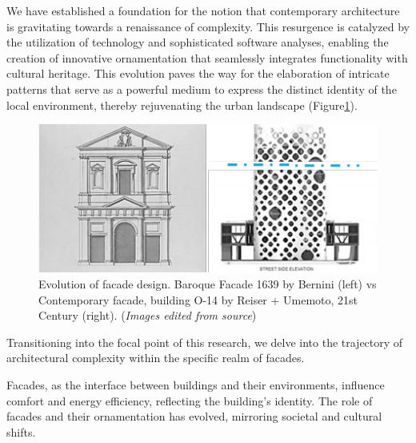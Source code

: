 


We have established a foundation for the notion that contemporary architecture is gravitating towards a renaissance of complexity.
This resurgence is catalyzed by the utilization of technology and sophisticated software analyses, enabling the creation of innovative ornamentation that seamlessly integrates functionality with cultural heritage.
This evolution paves the way for the elaboration of intricate patterns that serve as a powerful medium to express the distinct identity of the local environment, thereby rejuvenating the urban landscape (Figure\ref{fig:FacadeBaroqueVsContemporary}).

    \begin{figure}[htb]
        \centering
        \includegraphics[width= \linewidth]{Images/BaroqueVsContemporaryfacade}
        \caption{Evolution of facade design.
        Baroque Facade 1639 by Bernini (left) vs Contemporary facade, building O-14 by Reiser + Umemoto, 21st Century (right). (\textit{Images edited from source})}
        \label{fig:FacadeBaroqueVsContemporary}
    \end{figure}

Transitioning into the focal point of this research, we delve into the trajectory of architectural complexity within the specific realm of facades.

Facades, as the interface between buildings and their environments, influence comfort and energy efficiency, reflecting the building's identity\cite{Kamal2020}.
The role of facades and their ornamentation has evolved, mirroring societal and cultural shifts.

